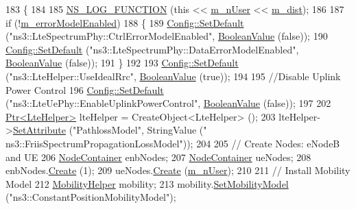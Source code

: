 \begin{DoxyCode}
183 \{
184 
185   \hyperlink{log-macros-disabled_8h_a90b90d5bad1f39cb1b64923ea94c0761}{NS\_LOG\_FUNCTION} (\textcolor{keyword}{this} << \hyperlink{classLenaTdMtFfMacSchedulerTestCase_a6e18eed688f5b1caee075826c8844267}{m\_nUser} << \hyperlink{classLenaTdMtFfMacSchedulerTestCase_a0aa6a40e725666a870d8c94c21ba156d}{m\_dist});
186 
187   \textcolor{keywordflow}{if} (!\hyperlink{classLenaTdMtFfMacSchedulerTestCase_ac304636fee017f49ca3fae7d53701c2d}{m\_errorModelEnabled})
188     \{
189       \hyperlink{group__config_ga2e7882df849d8ba4aaad31c934c40c06}{Config::SetDefault} (\textcolor{stringliteral}{"ns3::LteSpectrumPhy::CtrlErrorModelEnabled"}, 
      \hyperlink{classns3_1_1BooleanValue}{BooleanValue} (\textcolor{keyword}{false}));
190       \hyperlink{group__config_ga2e7882df849d8ba4aaad31c934c40c06}{Config::SetDefault} (\textcolor{stringliteral}{"ns3::LteSpectrumPhy::DataErrorModelEnabled"}, 
      \hyperlink{classns3_1_1BooleanValue}{BooleanValue} (\textcolor{keyword}{false}));
191     \}
192 
193   \hyperlink{group__config_ga2e7882df849d8ba4aaad31c934c40c06}{Config::SetDefault} (\textcolor{stringliteral}{"ns3::LteHelper::UseIdealRrc"}, 
      \hyperlink{classns3_1_1BooleanValue}{BooleanValue} (\textcolor{keyword}{true}));
194 
195   \textcolor{comment}{//Disable Uplink Power Control}
196   \hyperlink{group__config_ga2e7882df849d8ba4aaad31c934c40c06}{Config::SetDefault} (\textcolor{stringliteral}{"ns3::LteUePhy::EnableUplinkPowerControl"}, 
      \hyperlink{classns3_1_1BooleanValue}{BooleanValue} (\textcolor{keyword}{false}));
197 
202   \hyperlink{classns3_1_1Ptr}{Ptr<LteHelper>} lteHelper = CreateObject<LteHelper> ();
203   lteHelper->\hyperlink{classns3_1_1ObjectBase_ac60245d3ea4123bbc9b1d391f1f6592f}{SetAttribute} (\textcolor{stringliteral}{"PathlossModel"}, StringValue (\textcolor{stringliteral}{"
      ns3::FriisSpectrumPropagationLossModel"}));
204 
205   \textcolor{comment}{// Create Nodes: eNodeB and UE}
206   \hyperlink{classns3_1_1NodeContainer}{NodeContainer} enbNodes;
207   \hyperlink{classns3_1_1NodeContainer}{NodeContainer} ueNodes;
208   enbNodes.\hyperlink{classns3_1_1NodeContainer_a787f059e2813e8b951cc6914d11dfe69}{Create} (1);
209   ueNodes.\hyperlink{classns3_1_1NodeContainer_a787f059e2813e8b951cc6914d11dfe69}{Create} (\hyperlink{classLenaTdMtFfMacSchedulerTestCase_a6e18eed688f5b1caee075826c8844267}{m\_nUser});
210 
211   \textcolor{comment}{// Install Mobility Model}
212   \hyperlink{classns3_1_1MobilityHelper}{MobilityHelper} mobility;
213   mobility.\hyperlink{classns3_1_1MobilityHelper_a030275011b6f40682e70534d30280aba}{SetMobilityModel} (\textcolor{stringliteral}{"ns3::ConstantPositionMobilityModel"});

\end{DoxyCode}
